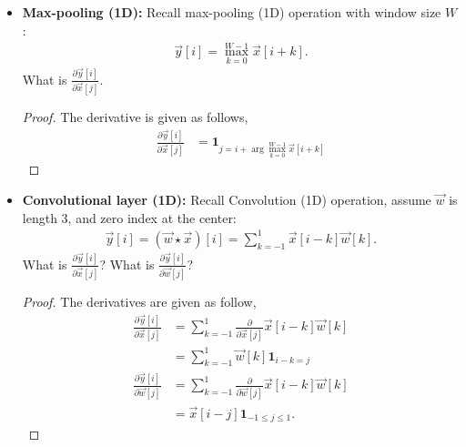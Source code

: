 \documentclass[11pt]{article}
\newcommand{\1}{\mathbf{1}}
\begin{document}
{\begin{itemize}
\begin{align*}
  \vec{y}[i] = \frac{1}{W} \sum_{k=0}^{W-1} \vec{x}[i+k].
\end{align*}
What is $\frac{\partial \vec{y}[i]}{\partial \vec{x}[j]}$.
\begin{proof}
  The derivative is given as follows,
  \begin{align*}
    \frac{\partial \vec{y}[i]}{\partial \vec{x}[j]} &= \frac{1}{W} \sum_{k=0}^{W-1} \frac{\partial}{\partial \vec{x}[j]} \vec{x}[i+k] \\
    &= \frac{1}{W} \1_{i \le j < i+W}
  \end{align*}
\end{proof}
\item {\bf Max-pooling (1D):} Recall max-pooling (1D) operation with window size $W$:
\begin{align*}
  \vec{y}[i] = \max_{k=0}^{W-1} \vec{x}[i+k].
\end{align*}
What is $\frac{\partial \vec{y}[i]}{\partial \vec{x}[j]}$.
\begin{proof}
  The derivative is given as follows,
  \begin{align*}
    \frac{\partial \vec{y}[i]}{\partial \vec{x}[j]} &= \1_{j = i + \arg\max_{k=0}^{W-1} \vec{x}[i+k]}
  \end{align*}
\end{proof}
\item {\bf Convolutional layer (1D):} Recall Convolution (1D) operation, assume $\vec{w}$ is length 3, and zero index at the center:
    \begin{align*}
      \vec{y}[i] = (\vec{w} \star \vec{x})[i] = \sum_{k=-1}^1 \vec{x}[i-k] \vec{w}[k].
    \end{align*}
What is $\frac{\partial \vec{y}[i]}{\partial \vec{x}[j]}$? What is $\frac{\partial \vec{y}[i]}{\partial \vec{w}[j]}$?
\begin{proof}
  The derivatives are given as follow,
  \begin{align*}
    \frac{\partial \vec{y}[i]}{\partial \vec{x}[j]} &= \sum_{k=-1}^1 \frac{\partial}{\partial \vec{x}[j]} \vec{x}[i-k] \vec{w}[k] \\
    &= \sum_{k=-1}^1 \vec{w}[k] \1_{i-k = j} \\
    \frac{\partial \vec{y}[i]}{\partial \vec{w}[j]} &= \sum_{k=-1}^1 \frac{\partial}{\partial \vec{w}[j]} \vec{x}[i-k] \vec{w}[k] \\
    &= \vec{x}[i-j]\1_{-1 \le j \le 1}.
  \end{align*}
\end{proof}
\end{itemize}

}
\end{document}
